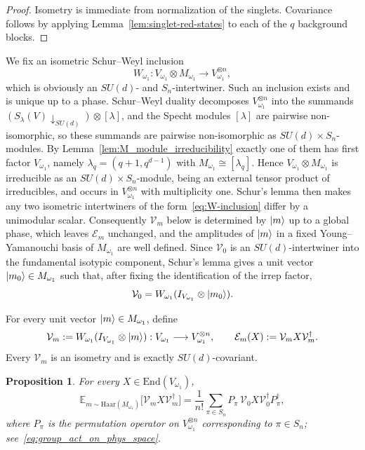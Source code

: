 \documentclass[10pt,twocolumn,superscriptaddress,aps,amsmath,amssymb,citeautoscript,floatfix,prx]{revtex4-2}
\theoremstyle{plain}
\theoremstyle{plain}
\theoremstyle{plain}
\theoremstyle{plain}
\theoremstyle{plain}
\theoremstyle{plain}
\newcommand{\End}{\mathrm{End}}
\theoremstyle{plain}
\newtheorem{smproposition}[smtheorem]{Proposition}
\theoremstyle{definition}
\theoremstyle{plain}
\begin{document}
\begin{appendix}
\begin{proof}
Isometry is immediate from normalization of the singlets.  
Covariance follows by applying Lemma~\ref{lem:singlet-red-states} to each of the $q$ background blocks.
\end{proof}
We fix an isometric Schur--Weyl inclusion
\begin{equation}
\label{eq:W-inclusion}
  W_{\omega_1}:V_{\omega_1}\otimes M_{\omega_1}\longrightarrow V_{\omega_1}^{\otimes n},
\end{equation}
which is obviously an $SU(d)$- and $S_n$-intertwiner.
Such an inclusion exists and is unique up to a phase. Schur--Weyl duality decomposes $V_{\omega_1}^{\otimes n}$ into the summands $\left(S_\lambda(V)\downarrow_{SU(d)}\right)\otimes[\lambda]$, 
and the Specht modules $[\lambda]$ are pairwise non-isomorphic, so these summands are pairwise non-isomorphic as $SU(d)\times S_n$-modules. 
By Lemma~\ref{lem:M_module_irreducibility} exactly one of them has first factor $V_{\omega_1}$, namely $\lambda_q=(q+1,q^{d-1})$ with $M_{\omega_1}\cong[\lambda_q]$. 
Hence $V_{\omega_1}\otimes M_{\omega_1}$ is irreducible as an $SU(d)\times S_n$-module, being an external tensor product of irreducibles, and occurs in $V_{\omega_1}^{\otimes n}$ with multiplicity one. 
Schur's lemma then makes any two isometric intertwiners of the form~\eqref{eq:W-inclusion} differ by a unimodular scalar. 
Consequently $\mathcal{V}_m$ below is determined by $\ket m$ up to a global phase, which leaves $\mathcal E_m$ unchanged, and the amplitudes of $\ket m$ in a fixed Young--Yamanouchi basis of $M_{\omega_1}$ are well defined.
Since $\mathcal{V}_0$ is an $SU(d)$-intertwiner into the fundamental isotypic component, Schur's lemma gives a unit vector $\ket{m_0}\in M_{\omega_1}$ such that, after fixing the identification of the irrep factor,
\begin{equation}
\label{eq:seed-multiplicity-vector}
  \mathcal{V}_0=W_{\omega_1}(I_{V_{\omega_1}}\otimes\ket{m_0}).
\end{equation}

For every unit vector $\ket m\in M_{\omega_1}$, define
\begin{equation}
\label{eq:Vm}
  \mathcal{V}_m:=W_{\omega_1}(I_{V_{\omega_1}}\otimes\ket m):V_{\omega_1}\longrightarrow V_{\omega_1}^{\otimes n},
  \qquad
  \mathcal{E}_m(X):=\mathcal{V}_mX\mathcal{V}_m^\dagger.
\end{equation}
Every $\mathcal{V}_m$ is an isometry and is exactly $SU(d)$-covariant.

\begin{smproposition}
\label{prop:orbit-twirl}
For every $X\in\End(V_{\omega_1})$,
\begin{equation}
\label{eq:orbit-twirl}
  \mathbb{E}_{m\sim\mathrm{Haar}(M_{\omega_1})}\bigl[\mathcal{V}_mX\mathcal{V}_m^\dagger\bigr]
  =\frac1{n!}\sum_{\pi\in S_n}
  P_\pi\,\mathcal{V}_0X\mathcal{V}_0^\dagger P_\pi^\dagger,
\end{equation}
where $P_\pi$ is the permutation operator on $V_{\omega_1}^{\otimes n}$ corresponding to $\pi\in S_n$; see~\eqref{eq:group_act_on_phys_space}.
\end{smproposition}


\end{appendix}
\end{document}
